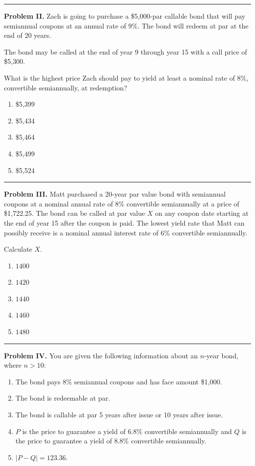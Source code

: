 \documentclass[11pt]{article}
\begin{document}
\medskip
\hrule

\textbf{Problem II.} Zach is going to purchase a \$5{,}000-par callable bond that will pay semiannual coupons at an annual rate of \(9\%\). The bond will redeem at par at the end of 20 years.

The bond may be called at the end of year 9 through year 15 with a call price of \$5{,}300.

What is the highest price Zach should pay to yield at least a nominal rate of \(8\%\), convertible semiannually, at redemption?

\begin{enumerate}[label=\Alph*.]
    \item \$5{,}399
    \item \$5{,}434
    \item \$5{,}464
    \item \$5{,}499
    \item \$5{,}524
\end{enumerate}

\medskip
\hrule

\textbf{Problem III.} Matt purchased a 20-year par value bond with semiannual coupons at a nominal annual rate of \(8\%\) convertible semiannually at a price of \$1{,}722.25. The bond can be called at par value \(X\) on any coupon date starting at the end of year 15 after the coupon is paid. The lowest yield rate that Matt can possibly receive is a nominal annual interest rate of \(6\%\) convertible semiannually.

Calculate \(X\).

\begin{enumerate}[label=\Alph*.]
    \item \(1400\)
    \item \(1420\)
    \item \(1440\)
    \item \(1460\)
    \item \(1480\)
\end{enumerate}

\medskip
\hrule

\newpage

\textbf{Problem IV.} You are given the following information about an \(n\)-year bond, where \(n>10\):

\begin{enumerate}[label=\roman*.]
    \item The bond pays \(8\%\) semiannual coupons and has face amount \$1{,}000.
    \item The bond is redeemable at par.
    \item The bond is callable at par 5 years after issue or 10 years after issue.
    \item \(P\) is the price to guarantee a yield of \(6.8\%\) convertible semiannually and \(Q\) is the price to guarantee a yield of \(8.8\%\) convertible semiannually.
    \item \(|P-Q|=123.36\).
\end{enumerate}
\end{document}
